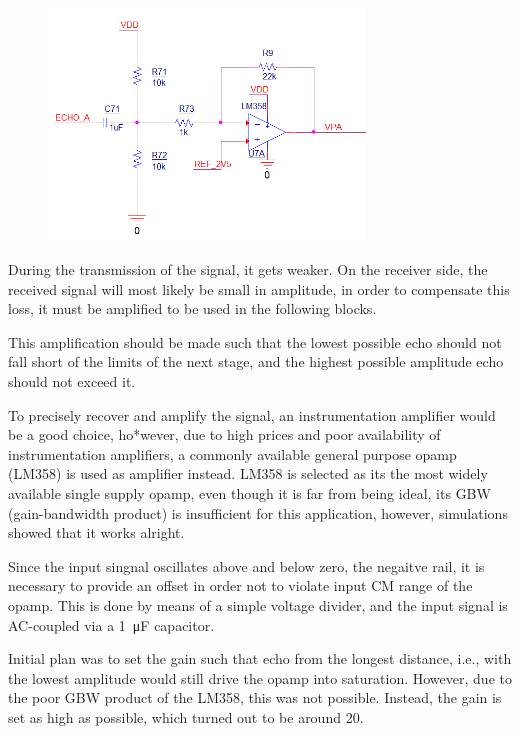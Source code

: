 \documentclass[12pt, a4paper]{article}
\begin{document}
            \begin{figure}[H]\centering
                \includegraphics[width = 0.75\textwidth]{schematics/preamp.png}
                \caption[]{}
            \end{figure}

            During the transmission of the signal, it gets weaker.  On the receiver side, the received signal will most likely be small in amplitude, in order to compensate this loss, it must be amplified to be used in the following blocks. 
            
            This amplification should be made such that the lowest possible echo should not fall short of the limits of the next stage, and the highest possible amplitude echo should not exceed it.

            \bigskip
            
            To precisely recover and amplify the signal, an instrumentation amplifier would be a good choice, ho*wever, due to high prices and poor availability of instrumentation amplifiers, a commonly available general purpose opamp  (LM358) is used as amplifier instead. LM358 is selected as its the most widely available single supply opamp, even though it is far from being ideal, its GBW (gain-bandwidth product) is insufficient for this application, however, simulations showed that it works alright.

            Since the input singnal oscillates above and below zero, the negaitve rail, it is necessary to provide an offset in order not to violate input CM range of the opamp. This is done by means of a simple voltage divider, and the input signal is AC-coupled via a \SI{1}{\micro\farad} capacitor.

            Initial plan was to set the gain such that echo from the longest distance, i.e., with the lowest amplitude would still drive the opamp into saturation. However, due to the poor GBW product of the LM358, this was not possible. Instead, the gain is set as high as possible, which turned out to be around 20. 
\end{document}
